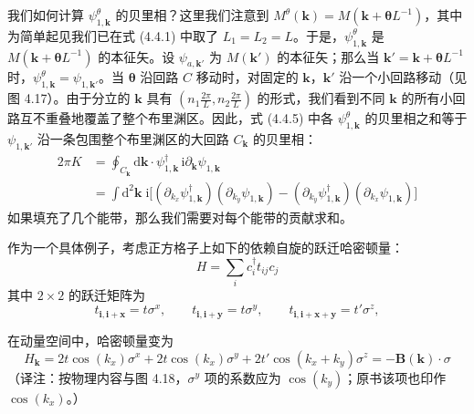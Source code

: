 我们如何计算 $\psi^{\theta}_{1,\pmb{k}}$ 的贝里相？这里我们注意到 $M^{\theta}(\pmb{k}) = M(\pmb{k} + \pmb{\theta} L^{-1})$，其中为简单起见我们已在式 (4.4.1) 中取了 $L_{1} = L_{2} = L$。于是，$\psi^{\theta}_{1,\pmb{k}}$ 是 $M(\pmb{k} + \pmb{\theta} L^{-1})$ 的本征矢。设 $\psi_{a,\pmb{k}'}$ 为 $M(\pmb{k}')$ 的本征矢；那么当 $\pmb{k}' = \pmb{k} + \pmb{\theta} L^{-1}$ 时，$\psi^{\theta}_{1,\pmb{k}} = \psi_{1,\pmb{k}'}$。当 $\pmb{\theta}$ 沿回路 $C$ 移动时，对固定的 $\pmb{k}$，$\pmb{k}'$ 沿一个小回路移动（见图 4.17）。由于分立的 $\pmb{k}$ 具有 $(n_{1} \frac{2\pi}{L}, n_{2} \frac{2\pi}{L})$ 的形式，我们看到不同 $\pmb{k}$ 的所有小回路互不重叠地覆盖了整个布里渊区。因此，式 (4.4.5) 中各 $\psi^{\theta}_{1,\pmb{k}}$ 的贝里相之和等于 $\psi_{1,\pmb{k}'}$ 沿一条包围整个布里渊区的大回路 $C_{\pmb{k}}$ 的贝里相：
\begin{align*}
2\pi K &= \oint_{C_{\pmb{k}}} \mathrm{d}\pmb{k} \cdot \psi_{1,\pmb{k}}^{\dagger}\, \mathrm{i} \partial_{\pmb{k}} \psi_{1,\pmb{k}}\\
&= \int \mathrm{d}^{2}\pmb{k}\; \mathrm{i} \big[ (\partial_{k_{x}} \psi_{1,\pmb{k}}^{\dagger}) (\partial_{k_{y}} \psi_{1,\pmb{k}}) - (\partial_{k_{y}} \psi_{1,\pmb{k}}^{\dagger}) (\partial_{k_{x}} \psi_{1,\pmb{k}}) \big] \tag{4.4.6}
\end{align*}
如果填充了几个能带，那么我们需要对每个能带的贡献求和。

作为一个具体例子，考虑正方格子上如下的依赖自旋的跃迁哈密顿量：
\begin{equation*}
H = \sum_{i} c_{i}^{\dagger} t_{ij} c_{j}
\end{equation*}
其中 $2 \times 2$ 的跃迁矩阵为
\begin{equation*}
t_{\pmb{i}, \pmb{i}+\pmb{x}} = t \sigma^{x}, \qquad t_{\pmb{i}, \pmb{i}+\pmb{y}} = t \sigma^{y}, \qquad t_{\pmb{i}, \pmb{i}+\pmb{x}+\pmb{y}} = t' \sigma^{z},
\end{equation*}


在动量空间中，哈密顿量变为
\begin{equation*}
H_{\pmb{k}} = 2 t \cos(k_{x}) \sigma^{x} + 2 t \cos(k_{x}) \sigma^{y} + 2 t' \cos(k_{x} + k_{y}) \sigma^{z} = -\pmb{B}(\pmb{k}) \cdot \sigma
\end{equation*}
（译注：按物理内容与图 4.18，$\sigma^{y}$ 项的系数应为 $\cos(k_{y})$；原书该项也印作 $\cos(k_{x})$。）

